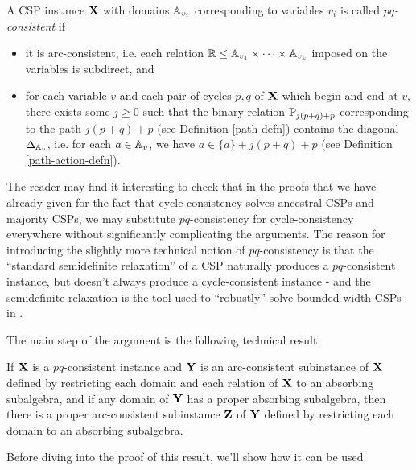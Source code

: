 \documentclass[letterpaper,11pt]{article}
\begin{document}
\begin{defn}\label{defn-pq-consistent} A CSP instance $\mathbf{X}$ with domains $\mathbb{A}_{v_i}$ corresponding to variables $v_i$ is called $pq$\emph{-consistent} if
\begin{itemize}
\item it is arc-consistent, i.e. each relation $\mathbb{R} \le \mathbb{A}_{v_1}\times\cdots \times \mathbb{A}_{v_k}$ imposed on the variables is subdirect, and
\item for each variable $v$ and each pair of cycles $p,q$ of $\mathbf{X}$ which begin and end at $v$, there exists some $j \ge 0$ such that the binary relation $\mathbb{P}_{j(p+q)+p}$ corresponding to the path $j(p+q)+p$ (see Definition \ref{path-defn}) contains the diagonal $\Delta_{\mathbb{A}_v}$, i.e. for each $a \in \mathbb{A}_v$, we have $a \in \{a\} + j(p+q)+p$ (see Definition \ref{path-action-defn}).
\end{itemize}
\end{defn}

The reader may find it interesting to check that in the proofs that we have already given for the fact that cycle-consistency solves ancestral CSPs and majority CSPs, we may substitute $pq$-consistency for cycle-consistency everywhere without significantly complicating the arguments. The reason for introducing the slightly more technical notion of $pq$-consistency is that the ``standard semidefinite relaxation'' of a CSP naturally produces a $pq$-consistent instance, but doesn't always produce a cycle-consistent instance - and the semidefinite relaxation is the tool used to ``robustly'' solve bounded width CSPs in \cite{sdp}.

The main step of the argument is the following technical result.

\begin{thm}\label{absorbing-reduction} If $\mathbf{X}$ is a $pq$-consistent instance and $\mathbf{Y}$ is an arc-consistent subinstance of $\mathbf{X}$ defined by restricting each domain and each relation of $\mathbf{X}$ to an absorbing subalgebra, and if any domain of $\mathbf{Y}$ has a proper absorbing subalgebra, then there is a proper arc-consistent subinstance $\mathbf{Z}$ of $\mathbf{Y}$ defined by restricting each domain to an absorbing subalgebra.
\end{thm}

Before diving into the proof of this result, we'll show how it can be used.
\end{document}
